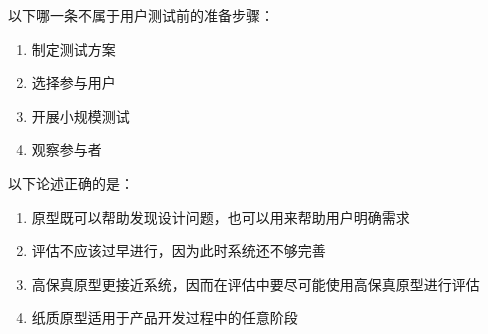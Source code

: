 \begin{problem}
	‍以下哪一条不属于用户测试前的准备步骤： 
    \vspace{-0.8em}
    \begin{multicols}{4}
        \begin{enumerate}[label=\Alph*.]
            \item 制定测试方案
            \item 选择参与用户
            \item 开展小规模测试
            \item 观察参与者
        \end{enumerate}
    \end{multicols}
    \vspace{-1em}
\end{problem}



\begin{problem}
	‍‍以下论述正确的是：
        \begin{enumerate}[label=\Alph*.]
            \item 原型既可以帮助发现设计问题，也可以用来帮助用户明确需求
            \item 评估不应该过早进行，因为此时系统还不够完善
            \item 高保真原型更接近系统，因而在评估中要尽可能使用高保真原型进行评估
            \item 纸质原型适用于产品开发过程中的任意阶段
        \end{enumerate}
\end{problem}
